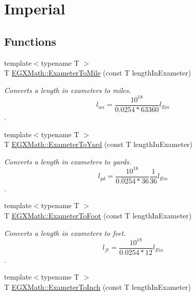 \hypertarget{group___e_g_x_math-_conversions-_length_conversions-_s_i-_exameter-_imperial}{}\section{Imperial}
\label{group___e_g_x_math-_conversions-_length_conversions-_s_i-_exameter-_imperial}
\subsection*{Functions}
\begin{DoxyCompactItemize}
\item 
{\footnotesize template$<$typename T $>$ }\\T \mbox{\hyperlink{group___e_g_x_math-_conversions-_length_conversions-_s_i-_exameter-_imperial_ga352ae8fb1bf743a0978e3ed05b06b61b}{E\+G\+X\+Math\+::\+Exameter\+To\+Mile}} (const T length\+In\+Exameter)
\begin{DoxyCompactList}\small\item\em Converts a length in exameters to miles. \[ l_{mi}=\frac{10^{18}}{0.0254 * 63360} l_{Em} \]. \end{DoxyCompactList}\item 
{\footnotesize template$<$typename T $>$ }\\T \mbox{\hyperlink{group___e_g_x_math-_conversions-_length_conversions-_s_i-_exameter-_imperial_gaaa37d3bd7aa2c3a8756ca2e2830bf8ac}{E\+G\+X\+Math\+::\+Exameter\+To\+Yard}} (const T length\+In\+Exameter)
\begin{DoxyCompactList}\small\item\em Converts a length in exameters to yards. \[ l_{yd}= \frac{10^{18}}{0.0254 * 36} \frac{1}{36} l_{Em} \]. \end{DoxyCompactList}\item 
{\footnotesize template$<$typename T $>$ }\\T \mbox{\hyperlink{group___e_g_x_math-_conversions-_length_conversions-_s_i-_exameter-_imperial_gac6057a24ad10c84b86ec52c9a37f916b}{E\+G\+X\+Math\+::\+Exameter\+To\+Foot}} (const T length\+In\+Exameter)
\begin{DoxyCompactList}\small\item\em Converts a length in exameters to feet. \[ l_{ft}= \frac{10^{18}}{0.0254 * 12} l_{Em} \]. \end{DoxyCompactList}\item 
{\footnotesize template$<$typename T $>$ }\\T \mbox{\hyperlink{group___e_g_x_math-_conversions-_length_conversions-_s_i-_exameter-_imperial_gabf4408961480eb2b76d2f5c588df128e}{E\+G\+X\+Math\+::\+Exameter\+To\+Inch}} (const T length\+In\+Exameter)

\end{DoxyCompactItemize}
